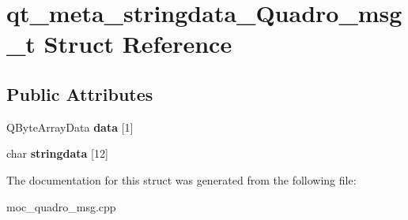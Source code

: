 \section{qt\-\_\-meta\-\_\-stringdata\-\_\-\-Quadro\-\_\-msg\-\_\-t Struct Reference}
\label{structqt__meta__stringdata___quadro__msg__t}
\subsection*{Public Attributes}
\begin{DoxyCompactItemize}
\item 
Q\-Byte\-Array\-Data {\bfseries data} [1]\label{structqt__meta__stringdata___quadro__msg__t_a64fddaab421047a5fe6034c187a8b02e}

\item 
char {\bfseries stringdata} [12]\label{structqt__meta__stringdata___quadro__msg__t_a9189c2de4834378f59894644f6aaa686}

\end{DoxyCompactItemize}


The documentation for this struct was generated from the following file\-:\begin{DoxyCompactItemize}
\item 
moc\-\_\-quadro\-\_\-msg.\-cpp\end{DoxyCompactItemize}
